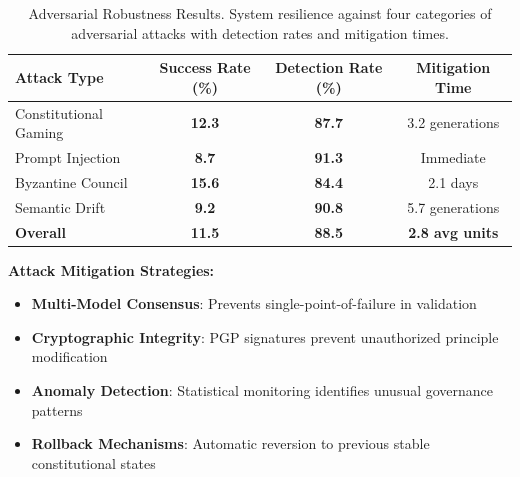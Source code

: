 \documentclass[manuscript,screen,review,anonymous,9pt]{acmart}
\newcommand{\tablesize}{\tiny}
\newcommand{\tablenumfmt}[1]{\textbf{#1}}
\begin{document}
\begin{table}[htbp]
	\centering
	\caption{Adversarial Robustness Results. System resilience against four categories of adversarial attacks with detection rates and mitigation times.}
	\label{tab:adversarial_results}
	\tablesize
	\begin{tabular}{@{}lccc@{}}
		\toprule
		\textbf{Attack Type}  & \textbf{Success Rate (\%)}  & \textbf{Detection Rate (\%)} & \textbf{Mitigation Time} \\
		\midrule
		Constitutional Gaming & \tablenumfmt{12.3}          & \tablenumfmt{87.7}           & 3.2 generations          \\
		Prompt Injection      & \tablenumfmt{8.7}           & \tablenumfmt{91.3}           & Immediate                \\
		Byzantine Council     & \tablenumfmt{15.6}          & \tablenumfmt{84.4}           & 2.1 days                 \\
		Semantic Drift        & \tablenumfmt{9.2}           & \tablenumfmt{90.8}           & 5.7 generations          \\
		\midrule
		\textbf{Overall}      & \textbf{\tablenumfmt{11.5}} & \textbf{\tablenumfmt{88.5}}  & \textbf{2.8 avg units}   \\
		\bottomrule
	\end{tabular}
\end{table}

\textbf{Attack Mitigation Strategies:}
\begin{itemize}
	\item \textbf{Multi-Model Consensus}: Prevents single-point-of-failure in validation
	\item \textbf{Cryptographic Integrity}: PGP signatures prevent unauthorized principle modification
	\item \textbf{Anomaly Detection}: Statistical monitoring identifies unusual governance patterns
	\item \textbf{Rollback Mechanisms}: Automatic reversion to previous stable constitutional states
\end{itemize}
\end{document}
